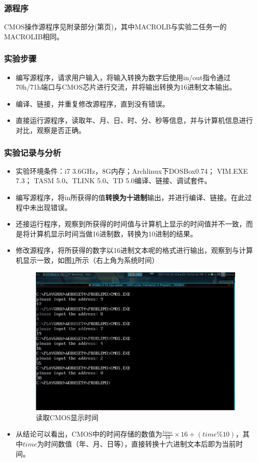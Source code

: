 \documentclass{article}
\begin{document}
	\subsubsection{源程序}
	CMOS操作源程序见附录部分(第\pageref{code:4_3}页)，其中MACROLB与实验二任务一的MACROLIB相同。

	\subsubsection{实验步骤}
	\begin{itemize}
		\item 编写源程序，请求用户输入，将输入转换为数字后使用in/out指令通过70h/71h端口与CMOS芯片进行交流，并将输出转换为16进制文本输出。
		\item 编译、链接，并重复修改源程序，直到没有错误。
		\item 直接运行源程序，读取年、月、日、时、分、秒等信息，并与计算机信息进行对比，观察是否正确。
	\end{itemize}

	\subsubsection{实验记录与分析}
	\begin{itemize}
		\item 实验环境条件：i7 3.6GHz，8G内存；Archlinux下DOSBox0.74； VIM.EXE 7.3； TASM 5.0、TLINK 5.0、TD 5.0编译、链接、调试套件。
		\item 编写源程序，将in所获得的值\textbf{转换为十进制}输出，并进行编译、链接。在此过程中未出现错误。
		\item 还接运行程序，观察到所获得的时间值与计算机上显示的时间值并不一致，而是将计算机显示时间当做16进制数，转换为10进制的结果。
		\item 修改源程序，将所获得的数字以16进制文本呢的格式进行输出，观察到与计算机显示一致，如图\ref{fig:cmos}所示（右上角为系统时间）
			\begin{figure}[H]
				\centering
				\includegraphics[width=0.95\linewidth]{res/homework_4/cmos.png}
				\caption{读取CMOS显示时间}
				\label{fig:cmos}
			\end{figure}
		\item 从结论可以看出，CMOS中的时间存储的数值为$\frac{time}{10}\times 16+(time\%10)$，其中$time$为时间数值（年、月、日等），直接转换十六进制文本后即为当前时间。
	\end{itemize}
\end{document}
